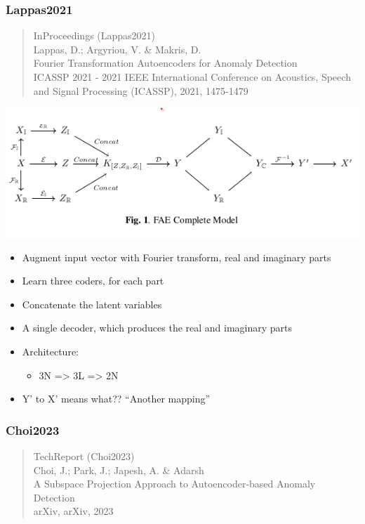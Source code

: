 \documentclass[
  letterpaper,
  DIV=11,
  numbers=noendperiod]{scrartcl}
\providecommand{\tightlist}{%
  \setlength{\itemsep}{0pt}\setlength{\parskip}{0pt}}\usepackage{longtable,booktabs,array}
\begin{document}
\subsubsection{Lappas2021}\label{lappas2021}

\begin{quote}
InProceedings (Lappas2021)\\
Lappas, D.; Argyriou, V. \& Makris, D.\\
Fourier Transformation Autoencoders for Anomaly Detection\\
ICASSP 2021 - 2021 IEEE International Conference on Acoustics, Speech
and Signal Processing (ICASSP), 2021, 1475-1479
\end{quote}

\includegraphics{img/2023-02-27-10-00-46.png}

\begin{itemize}
\tightlist
\item
  Augment input vector with Fourier transform, real and imaginary parts
\item
  Learn three coders, for each part
\item
  Concatenate the latent variables
\item
  A single decoder, which produces the real and imaginary parts
\item
  Architecture:

  \begin{itemize}
  \tightlist
  \item
    3N =\textgreater{} 3L =\textgreater{} 2N
  \end{itemize}
\item
  Y' to X' means what?? ``Another mapping''
\end{itemize}

\subsubsection{Choi2023}\label{choi2023}

\begin{quote}
TechReport (Choi2023)\\
Choi, J.; Park, J.; Japesh, A. \& Adarsh\\
A Subspace Projection Approach to Autoencoder-based Anomaly Detection\\
arXiv, arXiv, 2023
\end{quote}
\end{document}
